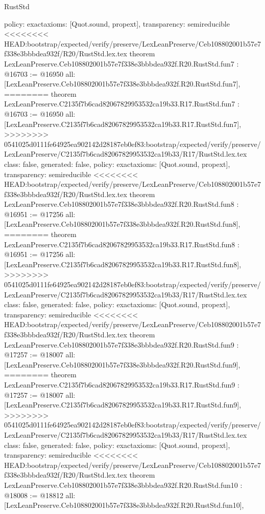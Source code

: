 \begin{lexlean}{RustStd}
\begin{coremodule}
{\begin{coremodule}
{{{{{{{{{{  policy: exact{axioms: [Quot.sound, propext]},
  transparency: semireducible
}
<<<<<<<< HEAD:bootstrap/expected/verify/preserve/LexLeanPreserve/Ceb108802001b57e7f338e3bbbdea932f/R20/RustStd.lex.tex
theorem LexLeanPreserve.Ceb108802001b57e7f338e3bbbdea932f.R20.RustStd.fun7 : @16703 := @16950 {
  all: [LexLeanPreserve.Ceb108802001b57e7f338e3bbbdea932f.R20.RustStd.fun7],
========
theorem LexLeanPreserve.C2135f7b6cad82067829953532ca19b33.R17.RustStd.fun7 : @16703 := @16950 {
  all: [LexLeanPreserve.C2135f7b6cad82067829953532ca19b33.R17.RustStd.fun7],
>>>>>>>> 0541025d0111fe64925ea902142d28187eb0ef83:bootstrap/expected/verify/preserve/LexLeanPreserve/C2135f7b6cad82067829953532ca19b33/R17/RustStd.lex.tex
  class: false,
  generated: false,
  policy: exact{axioms: [Quot.sound, propext]},
  transparency: semireducible
}
<<<<<<<< HEAD:bootstrap/expected/verify/preserve/LexLeanPreserve/Ceb108802001b57e7f338e3bbbdea932f/R20/RustStd.lex.tex
theorem LexLeanPreserve.Ceb108802001b57e7f338e3bbbdea932f.R20.RustStd.fun8 : @16951 := @17256 {
  all: [LexLeanPreserve.Ceb108802001b57e7f338e3bbbdea932f.R20.RustStd.fun8],
========
theorem LexLeanPreserve.C2135f7b6cad82067829953532ca19b33.R17.RustStd.fun8 : @16951 := @17256 {
  all: [LexLeanPreserve.C2135f7b6cad82067829953532ca19b33.R17.RustStd.fun8],
>>>>>>>> 0541025d0111fe64925ea902142d28187eb0ef83:bootstrap/expected/verify/preserve/LexLeanPreserve/C2135f7b6cad82067829953532ca19b33/R17/RustStd.lex.tex
  class: false,
  generated: false,
  policy: exact{axioms: [Quot.sound, propext]},
  transparency: semireducible
}
<<<<<<<< HEAD:bootstrap/expected/verify/preserve/LexLeanPreserve/Ceb108802001b57e7f338e3bbbdea932f/R20/RustStd.lex.tex
theorem LexLeanPreserve.Ceb108802001b57e7f338e3bbbdea932f.R20.RustStd.fun9 : @17257 := @18007 {
  all: [LexLeanPreserve.Ceb108802001b57e7f338e3bbbdea932f.R20.RustStd.fun9],
========
theorem LexLeanPreserve.C2135f7b6cad82067829953532ca19b33.R17.RustStd.fun9 : @17257 := @18007 {
  all: [LexLeanPreserve.C2135f7b6cad82067829953532ca19b33.R17.RustStd.fun9],
>>>>>>>> 0541025d0111fe64925ea902142d28187eb0ef83:bootstrap/expected/verify/preserve/LexLeanPreserve/C2135f7b6cad82067829953532ca19b33/R17/RustStd.lex.tex
  class: false,
  generated: false,
  policy: exact{axioms: [Quot.sound, propext]},
  transparency: semireducible
}
<<<<<<<< HEAD:bootstrap/expected/verify/preserve/LexLeanPreserve/Ceb108802001b57e7f338e3bbbdea932f/R20/RustStd.lex.tex
theorem LexLeanPreserve.Ceb108802001b57e7f338e3bbbdea932f.R20.RustStd.fun10 : @18008 := @18812 {
  all: [LexLeanPreserve.Ceb108802001b57e7f338e3bbbdea932f.R20.RustStd.fun10],
}}}}}}}}}}}}}
\end{coremodule}}
\end{coremodule}
\end{lexlean}
